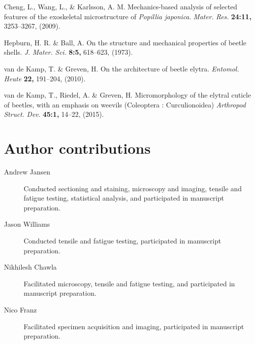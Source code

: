 \documentclass[twocolumn, linenumbers, superscriptaddress]{revtex4-1}
\begin{document}
\begin{thebibliography}{50}
				Cheng, L., Wang, L., \& Karlsson, A. M.
				Mechanics-based analysis of selected features of the exoskeletal microstructure of \textit{Popillia japonica}.
				\textit{Mater. Res.}
				\textbf{24:11,}
				3253--3267,
				(2009).
				
				Hepburn, H. R. \& Ball, A.
				On the structure and mechanical properties of beetle shells.
				\textit{J. Mater. Sci.}
				\textbf{8:5,}
				618--623,
				(1973).
				
				van de Kamp, T. \& Greven, H.
				On the architecture of beetle elytra.
				\textit{Entomol. Heute}
				\textbf{22,}
				191--204,
				(2010).
			
				van de Kamp, T., Riedel, A. \& Greven, H.
				Micromorphology of the elytral cuticle of beetles, with an emphasis on weevils (Coleoptera : Curculionoidea)
				\textit{Arthropod Struct. Dev.}
				\textbf{45:1,}
				14--22,
				(2015).
			
	\end{thebibliography}

	\begin{acknowledgements}

	\end{acknowledgements}

	\section*{Author contributions}
		\begin{description}
		\item[Andrew Jansen] Conducted sectioning and staining, microscopy and imaging, tensile and fatigue testing, statistical analysis, and participated in manuscript preparation.
		\item[Jason Williams] Conducted tensile and fatigue testing, participated in manuscript preparation.
		\item[Nikhilesh Chawla] Facilitated microscopy, tensile and fatigue testing, and participated in manuscript preparation.
		\item[Nico Franz] Facilitated specimen acquisition and imaging, participated in manuscript preparation.
		\end{description} 
	
\end{document}
